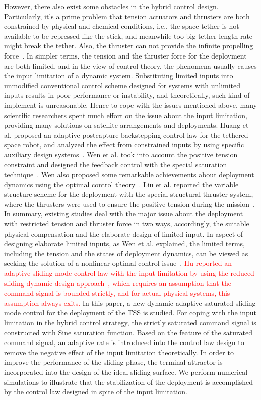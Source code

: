 \documentclass[3p]{elsarticle}
\theoremstyle{plain}
\theoremstyle{remark}
\begin{document}
However, there also exist some obstacles in the hybrid control design. Particularly, it's a prime problem that tension actuators and thrusters are both constrained by physical and chemical conditions, i.e., the space tether is not available to be repressed like the stick, and meanwhile too big tether length rate might break the tether. Also, the thruster can not provide the infinite propelling force~\cite{martinez1998spacecraft}. In simpler terms, the tension and the thruster force for the deployment are both limited, and in the view of control theory, the phenomena usually causes the input limitation of a dynamic system. Substituting limited inputs into unmodified conventional control scheme designed for systems with unlimited inputs results in poor performance or instability, and theoretically, such kind of implement is unreasonable. Hence to cope with the issues mentioned above, many scientific researchers spent much effort on the issue about the input limitation, providing many solutions on satellite arrangements and deployments. Huang et al. proposed an adaptive postcapture backstepping control law for the tethered space robot, and analyzed the effect from constrained inputs by using specific auxiliary design systems~\cite{huang2015adaptive}. Wen et al. took into account the positive tension constraint and designed the feedback control with the special saturation technique~\cite{wen2016constrained}. Wen also proposed some remarkable achievements about deployment dynamics using the optimal control theory~\cite{wen2008optimal}. Liu et al. reported the variable structure scheme for the deployment with the special structural thruster system, where the thrusters were used to ensure the positive tension during the mission~\cite{yingying2012variable}. In summary, existing studies deal with the major issue about the deployment with restricted tension and thruster force in two ways, accordingly, the suitable physical compensation and the elaborate design of limited input. In aspect of designing elaborate limited inputs, as Wen et al. explained, the limited terms, including the tension and the states of deployment dynamics, can be viewed as seeking the solution of a nonlinear optimal control issue~\cite{wen2015tension}. \textcolor{red}{Hu reported an adaptive sliding mode control law with the input limitation by using the reduced sliding dynamic design approach~\cite{Hu2009Robust}, which requires an assumption that the command signal is bounded strictly, and for actual physical systems, this assumption always exits.} In this paper, a new dynamic adaptive saturated sliding mode  control for the deployment of the TSS is studied. For coping with the input limitation in the hybrid control strategy, the strictly saturated command signal is constructed with Sine saturation function. Based on the feature of the saturated command signal, an adaptive rate is introduced into the control law design to remove the negative effect of the input limitation theoretically. In order to improve the performance of the sliding phase, the terminal attractor is incorporated into the design of the ideal sliding surface. We perform numerical simulations to illustrate that the stabilization of the deployment is accomplished by the control law designed in spite of the input limitation.\par
\end{document}
